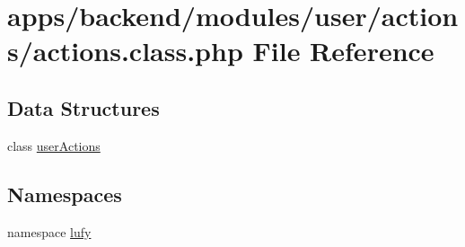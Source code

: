 \hypertarget{backend_2modules_2user_2actions_2actions_8class_8php}{\section{apps/backend/modules/user/actions/actions.class.\-php File Reference}
\label{backend_2modules_2user_2actions_2actions_8class_8php}
}
\subsection*{Data Structures}
\begin{DoxyCompactItemize}
\item 
class \hyperlink{classuser_actions}{user\-Actions}
\end{DoxyCompactItemize}
\subsection*{Namespaces}
\begin{DoxyCompactItemize}
\item 
namespace \hyperlink{namespacelufy}{lufy}
\end{DoxyCompactItemize}
